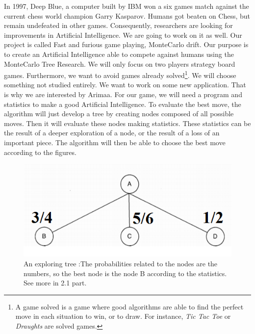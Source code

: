 
In 1997, Deep Blue, a computer built by IBM won a six games match against the current
chess world champion Garry Kasparov. Humans got beaten on Chess, but remain undefeated in other games. Consequently, researchers are looking for improvements in Artificial Intelligence. We are going to work on it as well.
\newline
\newline
Our project is called Fast and furious game playing, MonteCarlo drift. Our purpose is to create an Artificial Intelligence able to compete against humans using the MonteCarlo Tree Research.
\newline
We will only focus on two players strategy board games. Furthermore, we want to avoid games already solved\footnote{A game solved is a game where good algorithms are able to find the perfect move in each situation to win, or to draw. For instance, \textit{Tic Tac Toe} or \textit{Draughts} are solved games.}. We will choose something not studied entirely. We want to work on some new application. That is why we are interested by Arimaa.
\newline
\newline
For our game, we will need a program and statistics to make a good Artificial Intelligence. To evaluate the best move, the algorithm will just develop a tree by creating nodes composed of all possible moves. Then it will evaluate these nodes making statistics. These statistics can be the result of a deeper exploration of a node, or the result of a loss of an important piece. The algorithm will then be able to choose the best move according to the figures.
\smallbreak
\begin{figure}[!h] 
\centerline{\includegraphics[scale=0.50]{1_Presentation/1.1_Our_project_Dan/tree}}
  \caption{An exploring tree :\newline The probabilities related to the nodes are the numbers, so the best node is the node B according to the statistics. See more in 2.1 part.}
  \centering
\end{figure}
